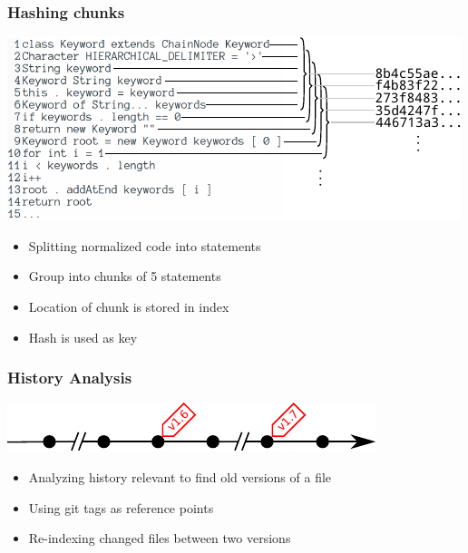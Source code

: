 \subsubsection{Hashing chunks}
\begin{frame}{\insertsubsection}{\insertsubsubsection}
	\begin{center}
		\includegraphics[width=0.9\linewidth]{fig/normalization_2.pdf}
	\end{center}
	\begin{itemize}
		\item Splitting normalized code into statements
		\item Group into chunks of 5 statements
		\item Location of chunk is stored in index
		\item Hash is used as key
	\end{itemize}
\end{frame}

\subsubsection{History Analysis}
\begin{frame}{\insertsubsection}{\insertsubsubsection}
	\begin{center}
		\includegraphics[width=\linewidth]{fig/history_analysis.pdf}
	\end{center}
	
	\begin{itemize}
		\item Analyzing history relevant to find old versions of a file
		\item Using git tags as reference points
		\item Re-indexing changed files between two versions
	\end{itemize}
\end{frame}

